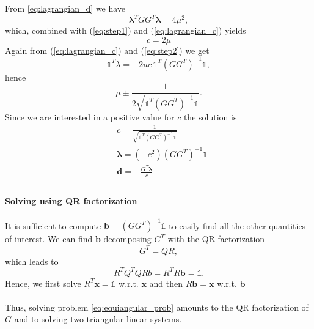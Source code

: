 \documentclass{article}
\renewcommand{\vec}[1]{\boldsymbol{#1}}
\newcommand{\onevec}{\mathds{1}}
\begin{document}
From \ref{eq:lagrangian_d} we have
\begin{equation}
	\vec{\lambda}^T GG^T \vec{\lambda} = 4\mu^2,
\end{equation} which, combined with (\ref{eq:step1}) and (\ref{eq:lagrangian_c}) yields
\begin{equation}
	c = 2\mu
\end{equation}
Again from (\ref{eq:lagrangian_c}) and (\ref{eq:step2}) we get
\begin{equation}
	\onevec^T\lambda = -2uc\, \onevec^T(GG^T)^{-1}\onevec,
\end{equation} hence 
\begin{equation}
	\mu \pm \frac{1}{2\sqrt{\onevec^T(GG^T)^{-1}\onevec}}.
\end{equation}
Since we are interested in a positive value for $c$ the solution is
\begin{align}
	& c = \frac{1}{\sqrt{\onevec^T(GG^T)^{-1}\onevec}}\\
	&\vec{\lambda} = (-c^2)(GG^T)^{-1} \onevec\\
	&\vec{d} = -\frac{G^T\vec{\lambda}}{c}\\
\end{align}

\paragraph{Solving using QR factorization}

It is sufficient to compute $\vec{b}=(GG^T)^{-1}\onevec$ to easily find all the other quantities of interest. We can find $\vec{b}$ decomposing $G^T$ with the QR factorization
\begin{equation}
	G^T=QR,
\end{equation}
which leads to 
\begin{equation}
	R^TQ^TQRb=R^TR\vec{b}=\onevec.
\end{equation}
Hence, we first solve $R^T\vec{x}=\onevec$ w.r.t. $\vec{x}$ and then $R\vec{b} = \vec{x}$ w.r.t. $\vec{b}$
\\\\
Thus, solving problem \ref{eq:equiangular_prob} amounts to the QR factorization of $G$ and to solving two triangular linear systems.
\end{document}
